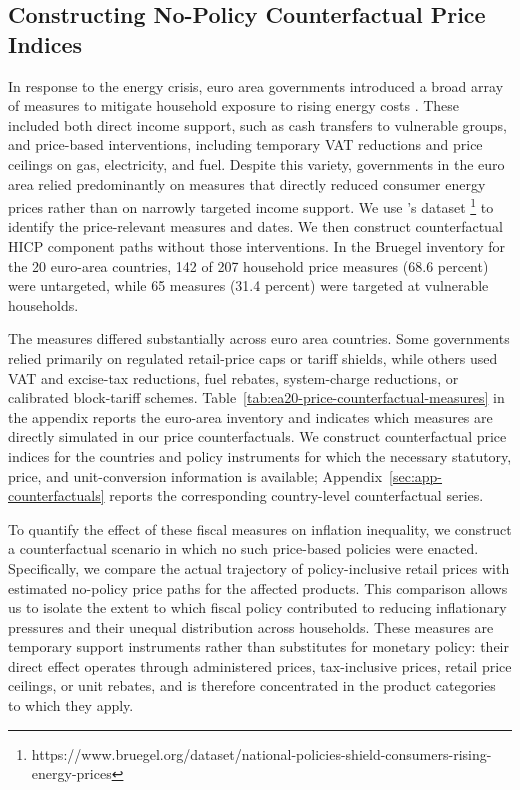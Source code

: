 \documentclass[11pt]{article}
\begin{document}
\subsection{Constructing No-Policy Counterfactual Price Indices}

In response to the energy crisis, euro area governments introduced a broad array of measures to
mitigate household exposure to rising energy costs
\citep{arregui2022targeted,dao2023unconventional,garciaMiralles2023support,levell2026welfare}.
These included both direct income support, such as cash transfers to vulnerable groups, and
price-based interventions, including temporary VAT reductions and price ceilings on gas,
electricity, and fuel. Despite this variety,  
governments in the euro area relied predominantly on measures that directly reduced consumer energy prices
rather than on narrowly targeted income support. We use \cite{sgaravatti2021national}'s dataset
\footnote{https://www.bruegel.org/dataset/national-policies-shield-consumers-rising-energy-prices}
 to identify the price-relevant measures and dates. We then
construct counterfactual HICP component paths without those interventions. In the Bruegel inventory for
the 20 euro-area countries, 142 of 207 household price measures (68.6 percent) were untargeted,
while 65 measures (31.4 percent) were targeted at vulnerable households.

The measures differed substantially across euro area countries. Some governments relied
primarily on regulated retail-price caps or tariff shields, while others used VAT and excise-tax
reductions, fuel rebates, system-charge reductions, or calibrated block-tariff schemes.
Table~\ref{tab:ea20-price-counterfactual-measures} in the appendix reports the euro-area inventory
and indicates which measures are directly simulated in our price counterfactuals. We construct
counterfactual price indices for the countries and policy instruments for which the necessary
statutory, price, and unit-conversion information is available;
Appendix~\ref{sec:app-counterfactuals} reports the corresponding country-level counterfactual
series.

To quantify the effect of these fiscal measures on inflation inequality, we construct a
counterfactual scenario in which no such price-based policies were enacted. Specifically, we compare
the actual trajectory of policy-inclusive retail prices with estimated no-policy price paths for the
affected products. This comparison allows us to isolate the extent to which fiscal policy
contributed to reducing inflationary pressures and their unequal distribution across households.
These measures are temporary support instruments rather than substitutes for monetary policy: their
direct effect operates through administered prices, tax-inclusive prices, retail price ceilings, or
unit rebates, and is therefore concentrated in the product categories to which they apply.
\end{document}
